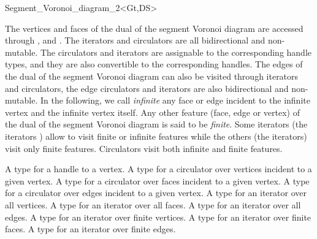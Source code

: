 \begin{ccRefClass}{Segment_Voronoi_diagram_2<Gt,DS>}

The vertices and faces of the dual of the segment Voronoi diagram are
accessed through , 
 and . 
The iterators and circulators
are all bidirectional and non-mutable.
The circulators and iterators are assignable to the 
corresponding handle types, and they are also convertible to the
corresponding handles.
The edges of the dual of the segment Voronoi diagram can also be
visited through iterators and circulators,
the edge circulators and iterators
are also bidirectional and non-mutable.
In the following, we call {\it infinite} any face or edge 
incident  to the infinite vertex and the infinite vertex itself.
Any other feature (face, edge or vertex) of the dual of the segment
Voronoi diagram is said to be {\it finite}.
Some iterators (the  iterators ) allow to visit finite or 
infinite features while the others (the  iterators) visit only
finite features. Circulators visit both infinite and finite features.

%
%
\ccGlue
{}
{A type for a handle to a vertex.}
\ccGlue
{}
\ccGlue
{}
{A type for a circulator over vertices incident to a given vertex.}
\ccGlue
{}
{A type for a circulator over faces incident to a given vertex.}
\ccGlue
{}
{A type for a circulator over edges incident to a given vertex.}
\ccGlue
{}
{A type for an iterator over all vertices.}
\ccGlue
{}
{A type for an iterator over all faces.}
\ccGlue
{}
{A type for an iterator over all edges.}
\ccGlue
{}
{A type for an iterator over finite vertices.}
\ccGlue
{}
{A type for an iterator over finite faces.}
\ccGlue
{}
{A type for an iterator over finite edges.}



\end{ccRefClass}
